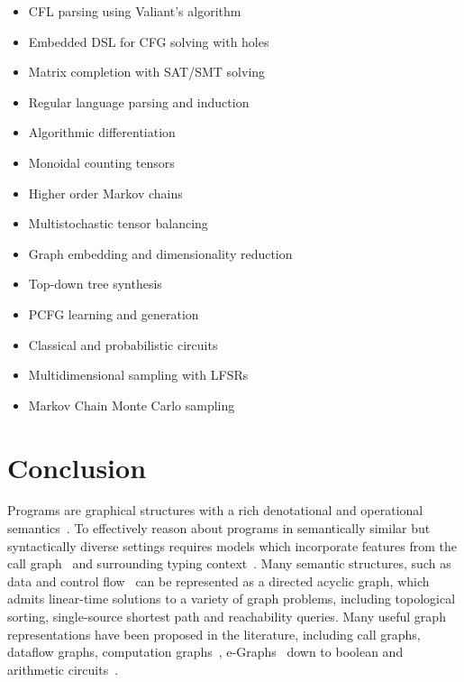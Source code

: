 \documentclass[sigplan,10pt,review,anonymous]{acmart}
\begin{document}
\begin{itemize}
  \item CFL parsing using Valiant's algorithm
  \item Embedded DSL for CFG solving with holes
  \item Matrix completion with SAT/SMT solving
  \item Regular language parsing and induction
  \item Algorithmic differentiation
  \item Monoidal counting tensors
  \item Higher order Markov chains
  \item Multistochastic tensor balancing
  \item Graph embedding and dimensionality reduction
  \item Top-down tree synthesis
  \item PCFG learning and generation
  \item Classical and probabilistic circuits
  \item Multidimensional sampling with LFSRs
  \item Markov Chain Monte Carlo sampling
\end{itemize}

\section{Conclusion}

Programs are graphical structures with a rich denotational and operational semantics~\cite{henkel2018code}. To effectively reason about programs in semantically similar but syntactically diverse settings requires models which incorporate features from the call graph~\cite{liu2019neural} and surrounding typing context~\cite{allamanis2017learning}. Many semantic structures, such as data and control flow~\cite{si2018learning} can be represented as a directed acyclic graph, which admits linear-time solutions to a variety of graph problems, including topological sorting, single-source shortest path and reachability queries. Many useful graph representations have been proposed in the literature, including call graphs, dataflow graphs, computation graphs~\citep{breuleux2017automatic}, e-Graphs~\citep{willsey2020egg} down to boolean and arithmetic circuits~\citep{miller1988efficient}.

\end{document}
